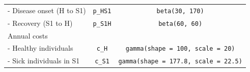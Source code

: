 \documentclass[]{book}
\begin{document}
\begin{longtable}[]{@{}lcc@{}}
\begin{minipage}[t]{0.43\columnwidth}
- Disease onset (H to S1)\strut
\end{minipage} & \begin{minipage}[t]{0.18\columnwidth}\centering\strut
\texttt{p\_HS1}\strut
\end{minipage} & \begin{minipage}[t]{0.20\columnwidth}\centering\strut
\texttt{beta(30,\ 170)}\strut
\end{minipage}\tabularnewline
\begin{minipage}[t]{0.43\columnwidth}\raggedright\strut
- Recovery (S1 to H)\strut
\end{minipage} & \begin{minipage}[t]{0.18\columnwidth}\centering\strut
\texttt{p\_S1H}\strut
\end{minipage} & \begin{minipage}[t]{0.20\columnwidth}\centering\strut
\texttt{beta(60,\ 60)}\strut
\end{minipage}\tabularnewline
\begin{minipage}[t]{0.43\columnwidth}\raggedright\strut
Annual costs\strut
\end{minipage} & \begin{minipage}[t]{0.18\columnwidth}\centering\strut
\strut
\end{minipage} & \begin{minipage}[t]{0.20\columnwidth}\centering\strut
\strut
\end{minipage}\tabularnewline
\begin{minipage}[t]{0.43\columnwidth}\raggedright\strut
- Healthy individuals\strut
\end{minipage} & \begin{minipage}[t]{0.18\columnwidth}\centering\strut
\texttt{c\_H}\strut
\end{minipage} & \begin{minipage}[t]{0.20\columnwidth}\centering\strut
\texttt{gamma(shape\ =\ 100,\ scale\ =\ 20)}\strut
\end{minipage}\tabularnewline
\begin{minipage}[t]{0.43\columnwidth}\raggedright\strut
- Sick individuals in S1\strut
\end{minipage} & \begin{minipage}[t]{0.18\columnwidth}\centering\strut
\texttt{c\_S1}\strut
\end{minipage} & \begin{minipage}[t]{0.20\columnwidth}\centering\strut
\texttt{gamma(shape\ =\ 177.8,\ scale\ =\ 22.5)}\strut
\end{minipage}\tabularnewline

\end{longtable}
\end{document}
